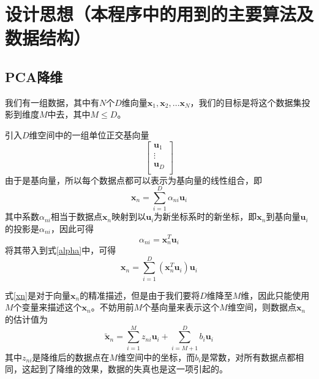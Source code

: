 \section{设计思想（本程序中的用到的主要算法及数据结构）}

\subsection{PCA降维}

我们有一组数据，其中有$N$个$D$维向量$\mathbf{x}_1, \mathbf{x}_2, \ldots \mathbf{x}_N$，我们的目标是将这个数据集投影到维度$M$中去，其中$M\leq D$。

引入$D$维空间中的一组单位正交基向量
\begin{equation*}
    \begin{bmatrix}
        \mathbf{u}_1 \\
        \vdots \\
        \mathbf{u}_D \\
    \end{bmatrix}
\end{equation*}
由于是基向量，所以每个数据点都可以表示为基向量的线性组合，即
\begin{equation}
    \mathbf{x}_n=\sum^D_{i=1}\alpha_{ni}\mathbf{u}_i
    \label{alpha}
\end{equation}
其中系数$\alpha_{ni}$相当于数据点$\mathbf{x}_n$映射到以$\mathbf{u}_i$为新坐标系时的新坐标，即$\mathbf{x}_n$到基向量$\mathbf{u}_i$的投影是$\alpha_{ni}$，因此可得
\begin{equation}
    \alpha_{ni}=\mathbf{x}^T_n\mathbf{u}_i
\end{equation}
将其带入到式\ref{alpha}中，可得
\begin{equation}
    \mathbf{x}_n=\sum^D_{i=1}\left(\mathbf{x}^T_n\mathbf{u}_i\right)\mathbf{u}_i
    \label{xn}
\end{equation}

式\ref{xn}是对于向量$\mathbf{x}_n$的精准描述，但是由于我们要将$D$维降至$M$维，因此只能使用$M$个变量来描述这个$\mathbf{x}_n$。不妨用前$M$个基向量来表示这个$M$维空间，则数据点$\mathbf{x}_n$的估计值为
\begin{equation}
    \tilde{\mathbf{x}}_n = \sum^M_{i=1}z_{ni}\mathbf{u}_i + \sum^D_{i=M+1}b_i\mathbf{u}_i
    \label{txn}
\end{equation}
其中$z_{ni}$是降维后的数据点在$M$维空间中的坐标，而$b_i$是常数，对所有数据点都相同，这起到了降维的效果，数据的失真也是这一项引起的。

